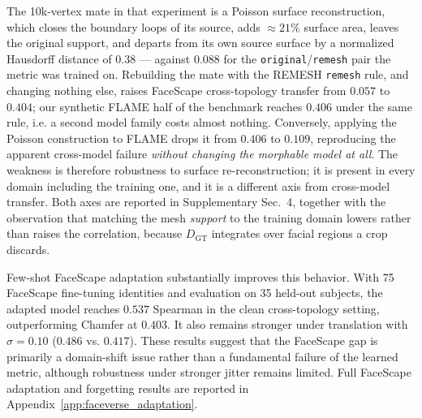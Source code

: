 \documentclass{article}
\begin{document}
The 10k-vertex mate in that experiment is a Poisson surface reconstruction, which closes
the boundary loops of its source, adds $\approx21\%$ surface area, leaves the original
support, and departs from its own source surface by a normalized Hausdorff distance of
$0.38$ --- against $0.088$ for the \texttt{original}/\texttt{remesh} pair the metric was
trained on. Rebuilding the mate with the REMESH \texttt{remesh} rule, and changing nothing
else, raises FaceScape cross-topology transfer from $0.057$ to $\mathbf{0.404}$; our
synthetic FLAME half of the benchmark reaches $0.406$ under the same rule, i.e. a second
model family costs almost nothing. Conversely, applying the Poisson construction to FLAME
drops it from $0.406$ to $0.109$, reproducing the apparent cross-model failure
\emph{without changing the morphable model at all}. The weakness is therefore robustness to
surface re-reconstruction; it is present in every domain including the training one, and it
is a different axis from cross-model transfer. Both axes are reported in Supplementary
Sec.~4, together with the observation that matching the mesh \emph{support} to the training
domain lowers rather than raises the correlation, because $D_{\mathrm{GT}}$ integrates over
facial regions a crop discards.

Few-shot FaceScape adaptation substantially improves this behavior. With 75 FaceScape fine-tuning identities and evaluation on 35 held-out subjects, the adapted model reaches $0.537$ Spearman in the clean cross-topology setting, outperforming Chamfer at $0.403$. It also remains stronger under translation with $\sigma=0.10$ ($0.486$ vs. $0.417$). These results suggest that the FaceScape gap is primarily a domain-shift issue rather than a fundamental failure of the learned metric, although robustness under stronger jitter remains limited. Full FaceScape adaptation and forgetting results are reported in
Appendix~\ref{app:faceverse_adaptation}.
\end{document}
